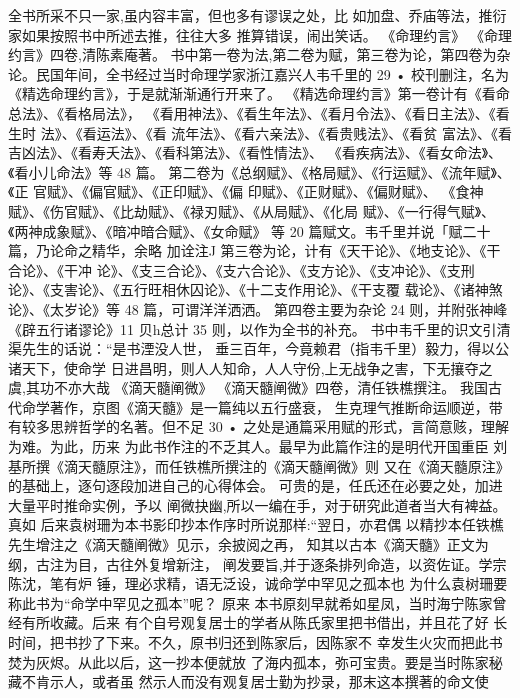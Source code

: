 全书所采不只一家,虽内容丰富，但也多有谬误之处，比
如加盘、乔庙等法，推衍家如果按照书中所述去推，往往大多
推算错误，闹出笑话。
《命理约言》
《命理约言》四卷,清陈素庵著。
书中第一卷为法,第二卷为赋，第三卷为论，第四卷为杂
论。民国年间，全书经过当时命理学家浙江嘉兴人韦千里的
29 •
校刊删注，名为《精选命理约言》，于是就渐渐通行开来了。
《精选命理约言》第一卷计有《看命总法》、《看格局法》，
《看用神法》、《看生年法》、《看月令法》、《看日主法》、《看生时
法》、《看运法》、《看 流年法》、《看六亲法》、《看贵贱法》、《看贫
富法》、《看吉凶法》、《看寿夭法》、《看科第法》、《看性情法》、
《看疾病法》、《看女命法》、《看小儿命法》等 48 篇。
第二卷为《总纲赋》、《格局赋》、《行运赋》、《流年赋》、《正
官赋》、《偏官赋》、《正印赋》、《偏 印赋》、《正财赋》、《偏财赋》、
《食神赋》、《伤官赋》、《比劫赋》、《禄刃赋》、《从局赋》、《化局
赋》、《一行得气赋》、《两神成象赋》、《暗冲暗合赋》、《女命赋》
等 20 篇赋文。韦千里并说「赋二十篇，乃论命之精华，余略
加诠注J
第三卷为论，计有《天干论》、《地支论》、《干合论》、《干冲
论》、《支三合论》、《支六合论》、《支方论》、《支冲论》、《支刑
论》、《支害论》、《五行旺相休囚论》、《十二支作用论》、《干支覆
载论》、《诸神煞论》、《太岁论》等 48 篇，可谓洋洋洒洒。
第四卷主要为杂论 24 则，并附张神峰《辟五行诸谬论》11
贝h总计 35 则，以作为全书的补充。
书中韦千里的识文引清渠先生的话说：“是书湮没人世，
垂三百年，今竟赖君（指韦千里）毅力，得以公诸天下，使命学
日进昌明，则人人知命，人人守份,上无战争之害，下无攘夺之
虞,其功不亦大哉
《滴天髓阐微》
《滴天髓阐微》四卷，清任铁樵撰注。
我国古代命学著作，京图《滴天髓》是一篇纯以五行盛衰，
生克理气推断命运顺逆，带有较多思辨哲学的名著。但不足
30 •
之处是通篇采用赋的形式，言简意赅，理解为难。为此，历来
为此书作注的不乏其人。最早为此篇作注的是明代开国重臣
刘基所撰《滴天髓原注》，而任铁樵所撰注的《滴天髓阐微》则
又在《滴天髓原注》的基础上，逐句逐段加进自己的心得体会。
可贵的是，任氏还在必要之处，加进大量平时推命实例，予以
阐微抉幽,所以一编在手，对于研究此道者当大有裨益。真如
后来袁树珊为本书影印抄本作序时所说那样:“翌日，亦君偶
以精抄本任铁樵先生增注之《滴天髓阐微》见示，余披阅之再，
知其以古本《滴天髓》正文为纲，古注为目，古往外复增新注，
阐发要旨,并于逐条排列命造，以资佐证。学宗陈沈，笔有炉
锤，理必求精，语无泛设，诚命学中罕见之孤本也
为什么袁树珊要称此书为“命学中罕见之孤本”呢？ 原来
本书原刻早就希如星凤，当时海宁陈家曾经有所收藏。后来
有个自号观复居士的学者从陈氏家里把书借出，并且花了好
长时间，把书抄了下来。不久，原书归还到陈家后，因陈家不
幸发生火灾而把此书焚为灰烬。从此以后，这一抄本便就放
了海内孤本，弥可宝贵。要是当时陈家秘藏不肯示人，或者虽
然示人而没有观复居士勤为抄录，那末这本撰著的命文使
